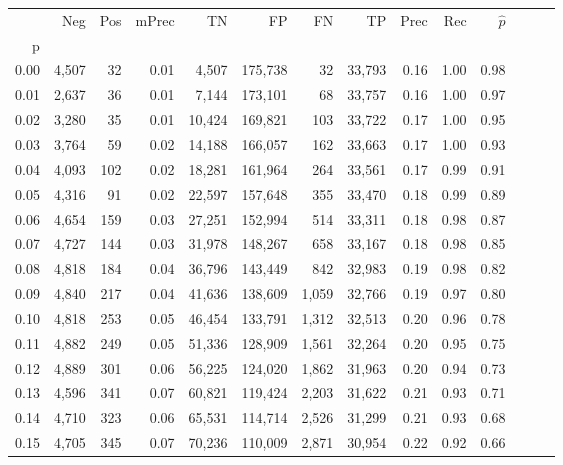 \begin{tabular}{rrrrrrrrrrrrrr}
\toprule
{} &    Neg &  Pos & mPrec &       TN &       FP &      FN &      TP &  Prec &   Rec & $\hat{p}$ \\
p    &        &      &       &          &          &         &         &       &       &           \\
\midrule
0.00 &  4,507 &   32 &  0.01 &    4,507 &  175,738 &      32 &  33,793 &  0.16 &  1.00 &      0.98 \\
0.01 &  2,637 &   36 &  0.01 &    7,144 &  173,101 &      68 &  33,757 &  0.16 &  1.00 &      0.97 \\
0.02 &  3,280 &   35 &  0.01 &   10,424 &  169,821 &     103 &  33,722 &  0.17 &  1.00 &      0.95 \\
0.03 &  3,764 &   59 &  0.02 &   14,188 &  166,057 &     162 &  33,663 &  0.17 &  1.00 &      0.93 \\
0.04 &  4,093 &  102 &  0.02 &   18,281 &  161,964 &     264 &  33,561 &  0.17 &  0.99 &      0.91 \\
0.05 &  4,316 &   91 &  0.02 &   22,597 &  157,648 &     355 &  33,470 &  0.18 &  0.99 &      0.89 \\
0.06 &  4,654 &  159 &  0.03 &   27,251 &  152,994 &     514 &  33,311 &  0.18 &  0.98 &      0.87 \\
0.07 &  4,727 &  144 &  0.03 &   31,978 &  148,267 &     658 &  33,167 &  0.18 &  0.98 &      0.85 \\
0.08 &  4,818 &  184 &  0.04 &   36,796 &  143,449 &     842 &  32,983 &  0.19 &  0.98 &      0.82 \\
0.09 &  4,840 &  217 &  0.04 &   41,636 &  138,609 &   1,059 &  32,766 &  0.19 &  0.97 &      0.80 \\
0.10 &  4,818 &  253 &  0.05 &   46,454 &  133,791 &   1,312 &  32,513 &  0.20 &  0.96 &      0.78 \\
0.11 &  4,882 &  249 &  0.05 &   51,336 &  128,909 &   1,561 &  32,264 &  0.20 &  0.95 &      0.75 \\
0.12 &  4,889 &  301 &  0.06 &   56,225 &  124,020 &   1,862 &  31,963 &  0.20 &  0.94 &      0.73 \\
0.13 &  4,596 &  341 &  0.07 &   60,821 &  119,424 &   2,203 &  31,622 &  0.21 &  0.93 &      0.71 \\
0.14 &  4,710 &  323 &  0.06 &   65,531 &  114,714 &   2,526 &  31,299 &  0.21 &  0.93 &      0.68 \\
0.15 &  4,705 &  345 &  0.07 &   70,236 &  110,009 &   2,871 &  30,954 &  0.22 &  0.92 &      0.66 \\

\end{tabular}
